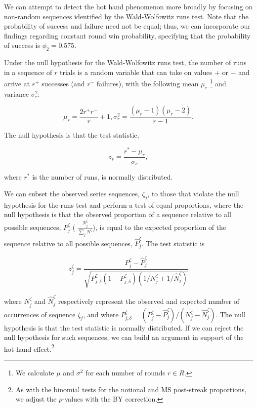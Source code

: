 \documentclass{article}
\begin{document}
We can attempt to detect the hot hand phenomenon more broadly by
focusing on non-random sequences identified by the Wald-Wolfowitz runs
test. Note that the probability of success and failure need not be
equal; thus, we can incorporate our findings regarding constant round
win probability, specifying that the probability of success is
\(\phi_2 = 0.575\).

Under the null hypothesis for the Wald-Wolfowitz runs test, the number
of runs in a sequence of \(r\) trials is a random variable that can take
on values \(+\) or \(-\) and arrive at \(r^+\) successes (and \(r^-\)
failures), with the following mean \(\mu_r\) \footnote{We calculate
  \(\mu\) and \(\sigma^2\) for each number of rounds \(r \in R\).} and
variance \(\sigma_r^2\):

\begin{equation}\label{eq:ww}
\mu_r = \frac{2r^{+}r^{-}}{r} + 1, \sigma_r^2 = \frac{(\mu_r-1)(\mu_r-2)}{r-1}.
\end{equation}

The null hypothesis is that the test statistic,

\begin{equation}\label{eq:wwz}
z_r = \frac{r^* - \mu_r}{\sigma_r},
\end{equation}

where \(r^*\) is the number of runs, is normally distributed.

We can subset the observed series sequences, \(\zeta_j\), to those that
violate the null hypothesis for the runs test and perform a test of
equal proportions, where the null hypothesis is that the observed
proportion of a sequence relative to all possible sequences,
\(P^{\zeta}_j\) ( \(\frac{N^\zeta_j}{\sum_j N^\zeta }\)), is equal to
the expected proportion of the sequence relative to all possible
sequences, \(\hat{P}^\zeta_j\). The test statistic is

\begin{equation}\label{eq:prop}
z^\zeta_j = \frac{P^\zeta_j - \hat{P}^\zeta_j}{\sqrt{P^\zeta_{j,\delta} (1 - P^\zeta_{j,\delta}) (1 / N^\zeta_j + 1 / \hat{N}^\zeta_j)  } }
\end{equation}

where \(N^\zeta_j\) and \(\hat{N}^\zeta_j\) respectively represent the
observed and expected number of occurrences of sequence \(\zeta_j\), and
where
\(P^\zeta_{j,\delta} = (P^\zeta_j - \hat{P}^\zeta_j) / ({N^\zeta_j - \hat{N}^\zeta_j})\).
The null hypothesis is that the test statistic is normally distributed.
If we can reject the null hypothesis for such sequences, we can build an
argument in support of the hot hand effect.\footnote{As with the
  binomial tests for the notional and MS post-streak proportions, we
  adjust the \(p\)-values with the BY correction.}
\end{document}
